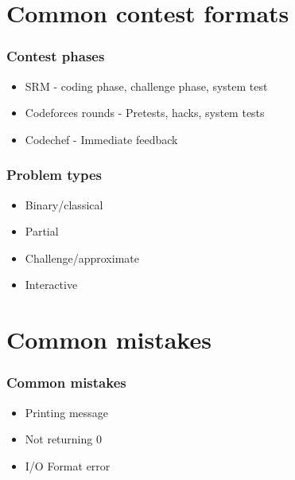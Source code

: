 \section{Common contest formats}
\begin{frame}
    \frametitle{Contest phases}
    \begin{itemize}
        \item SRM - coding phase, challenge phase, system test \\ \pause
        \item Codeforces rounds - Pretests, hacks, system tests \\ \pause
        \item Codechef - Immediate feedback \\
    \end{itemize}
\end{frame}

\begin{frame}
    \frametitle{Problem types}
    \begin{itemize}
        \item Binary/classical \\ \pause
        \item Partial \\ \pause
        \item Challenge/approximate \\ \pause
        \item Interactive \\
    \end{itemize}
\end{frame}

\section{Common mistakes}
\begin{frame}
    \frametitle{Common mistakes}
    \begin{itemize}
        \item Printing message \\ \pause
        \item Not returning 0 \\ \pause
        \item I/O Format error \\ \pause
    \end{itemize}
\end{frame}

